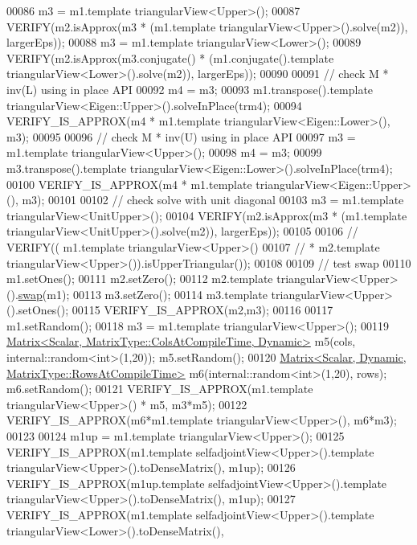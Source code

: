 \begin{DoxyCode}
00086   m3 = m1.template triangularView<Upper>();
00087   VERIFY(m2.isApprox(m3 * (m1.template triangularView<Upper>().solve(m2)), largerEps));
00088   m3 = m1.template triangularView<Lower>();
00089   VERIFY(m2.isApprox(m3.conjugate() * (m1.conjugate().template triangularView<Lower>().solve(m2)), 
      largerEps));
00090 
00091   \textcolor{comment}{// check M * inv(L) using in place API}
00092   m4 = m3;
00093   m1.transpose().template triangularView<Eigen::Upper>().solveInPlace(trm4);
00094   VERIFY\_IS\_APPROX(m4 * m1.template triangularView<Eigen::Lower>(), m3);
00095 
00096   \textcolor{comment}{// check M * inv(U) using in place API}
00097   m3 = m1.template triangularView<Upper>();
00098   m4 = m3;
00099   m3.transpose().template triangularView<Eigen::Lower>().solveInPlace(trm4);
00100   VERIFY\_IS\_APPROX(m4 * m1.template triangularView<Eigen::Upper>(), m3);
00101 
00102   \textcolor{comment}{// check solve with unit diagonal}
00103   m3 = m1.template triangularView<UnitUpper>();
00104   VERIFY(m2.isApprox(m3 * (m1.template triangularView<UnitUpper>().solve(m2)), largerEps));
00105 
00106 \textcolor{comment}{//   VERIFY((  m1.template triangularView<Upper>()}
00107 \textcolor{comment}{//           * m2.template triangularView<Upper>()).isUpperTriangular());}
00108 
00109   \textcolor{comment}{// test swap}
00110   m1.setOnes();
00111   m2.setZero();
00112   m2.template triangularView<Upper>().\hyperlink{endian_8c_a3ca5ecd34b04d6a243c054ac3a57f68d}{swap}(m1);
00113   m3.setZero();
00114   m3.template triangularView<Upper>().setOnes();
00115   VERIFY\_IS\_APPROX(m2,m3);
00116   
00117   m1.setRandom();
00118   m3 = m1.template triangularView<Upper>();
00119   \hyperlink{group___core___module_class_eigen_1_1_matrix}{Matrix<Scalar, MatrixType::ColsAtCompileTime, Dynamic>}
       m5(cols, internal::random<int>(1,20));  m5.setRandom();
00120   \hyperlink{group___core___module_class_eigen_1_1_matrix}{Matrix<Scalar, Dynamic, MatrixType::RowsAtCompileTime>}
       m6(internal::random<int>(1,20), rows);  m6.setRandom();
00121   VERIFY\_IS\_APPROX(m1.template triangularView<Upper>() * m5, m3*m5);
00122   VERIFY\_IS\_APPROX(m6*m1.template triangularView<Upper>(), m6*m3);
00123 
00124   m1up = m1.template triangularView<Upper>();
00125   VERIFY\_IS\_APPROX(m1.template selfadjointView<Upper>().template triangularView<Upper>().toDenseMatrix(), 
      m1up);
00126   VERIFY\_IS\_APPROX(m1up.template selfadjointView<Upper>().template triangularView<Upper>().toDenseMatrix(),
       m1up);
00127   VERIFY\_IS\_APPROX(m1.template selfadjointView<Upper>().template triangularView<Lower>().toDenseMatrix(), 

\end{DoxyCode}
